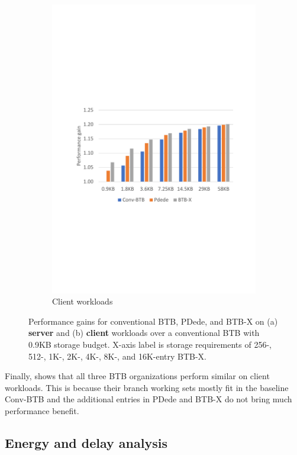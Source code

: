 \begin{figure}
\begin{subfigure}[t]{0.935\columnwidth}
        \includegraphics[width=0.935\columnwidth, trim=70 235 60 250, clip]{figures/ISOStorage_client_revised.pdf}
        \caption{Client workloads}
        \label{fig:clientPerf}
    \end{subfigure}
    \caption{Performance gains for conventional BTB, PDede, and BTB-X on (a) \textbf{server} and (b) \textbf{client} workloads over a conventional BTB with 0.9KB storage budget. X-axis label is storage requirements of 256-, 512-, 1K-, 2K-, 4K-, 8K-, and 16K-entry BTB-X.}\label{fig:perf}
\end{figure}

Finally,  shows that all three BTB organizations perform similar on client workloads. This is because their branch working sets mostly fit in the baseline Conv-BTB and the additional entries in PDede and BTB-X do not bring much performance benefit.

\subsection{Energy and delay analysis}

